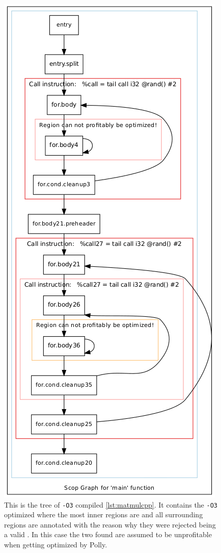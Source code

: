 \begin{figure}[!h]
    \centering
    \caption[The SCoP tree of \texttt{-O3} compiled \autoref{lst:matmulcpp}]{
        This is the \scop tree of \texttt{-O3} compiled \autoref{lst:matmulcpp}.
        It contains the \texttt{-O3} optimized \cfg where the most inner regions are \scops and all surrounding regions are annotated with the reason why they were rejected being a valid \scop.
        In this case the two found \scops are assumed to be unprofitable when getting optimized by Polly.
    }
    \label{fig:exampleScop}
    \includegraphics[height=\textheight]{gfx/matmulScops.png}
\end{figure}
